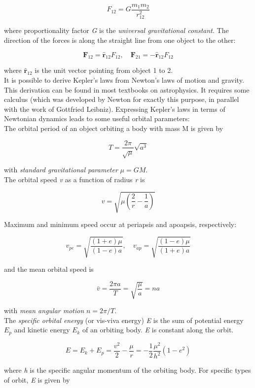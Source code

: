 \documentclass[Orbiter User Manual.tex]{subfiles}
\begin{document}
\[ F_{12} = G \frac{m_{1}m_{2}}{r_{12}^{2}} \]

\noindent
where proportionality factor \textit{G} is the \textit{universal gravitational constant}. The direction of the forces is along the straight line from one object to the other:

\[ \textbf{F}_{12} = \hat{\textbf{r}}_{12} F_{12}, \quad \textbf{F}_{21} = - \hat{\textbf{r}}_{12} F_{12} \]

\noindent
where $\hat{\textbf{r}}_{12}$ is the unit vector pointing from object 1 to 2.\\
It is possible to derive Kepler’s laws from Newton’s laws of motion and gravity. This derivation can be found in most textbooks on astrophysics. It requires some calculus (which was developed by Newton for exactly this purpose, in parallel with the work of Gottfried Leibniz). Expressing Kepler’s laws in terms of Newtonian dynamics leads to some useful orbital parameters:\\
The orbital period of an object orbiting a body with mass M is given by

\[ T = \frac{2 \pi}{\sqrt{\mu}} \sqrt{a^{3}} \]

\noindent
with \textit{standard gravitational parameter} $\mu = GM$.\\
The orbital speed \textit{v} as a function of radius \textit{r} is

\[ v = \sqrt{\mu \left(\frac{2}{r} - \frac{1}{a}\right)} \]

\noindent
Maximum and minimum speed occur at periapsis and apoapsis, respectively:

\[ v_{pe} = \sqrt{\frac{(1 + e) \mu}{(1 - e) a}}, \quad v_{ap} = \sqrt{\frac{(1 - e) \mu}{(1 + e) a}} \]

\noindent
and the mean orbital speed is

\[ \bar{v} = \frac{2 \pi a}{T} = \sqrt{\frac{\mu}{a}} = n a \]

\noindent
with \textit{mean angular motion} $n = 2 \pi / T$.\\
The \textit{specific orbital energy} (or vis-viva energy) \textit{E} is the sum of potential energy $E_{p}$ and kinetic energy $E_{k}$ of an orbiting body. \textit{E} is constant along the orbit.

\[ E = E_{k} + E_{p} = \frac{v^{2}}{2} - \frac{\mu}{r} = - \frac{1}{2} \frac{\mu^{2}}{h^{2}}(1 - e^{2}) \]

\noindent
where \textit{h} is the specific angular momentum of the orbiting body. For specific types of orbit, \textit{E} is given by
\end{document}
